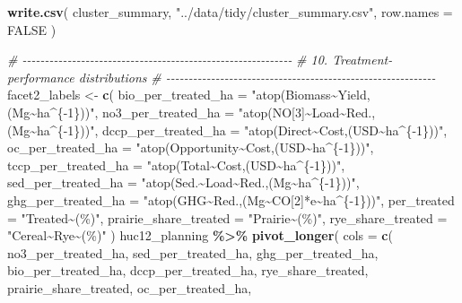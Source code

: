 \documentclass[
]{article}
\newenvironment{Shaded}{\begin{snugshade}}{\end{snugshade}}
\newcommand{\AttributeTok}[1]{\textcolor[rgb]{0.13,0.29,0.53}{#1}}
\newcommand{\CommentTok}[1]{\textcolor[rgb]{0.56,0.35,0.01}{\textit{#1}}}
\newcommand{\ConstantTok}[1]{\textcolor[rgb]{0.56,0.35,0.01}{#1}}
\newcommand{\FunctionTok}[1]{\textcolor[rgb]{0.13,0.29,0.53}{\textbf{#1}}}
\newcommand{\NormalTok}[1]{#1}
\newcommand{\OtherTok}[1]{\textcolor[rgb]{0.56,0.35,0.01}{#1}}
\newcommand{\SpecialCharTok}[1]{\textcolor[rgb]{0.81,0.36,0.00}{\textbf{#1}}}
\newcommand{\StringTok}[1]{\textcolor[rgb]{0.31,0.60,0.02}{#1}}
\begin{document}
\begin{Shaded}
\begin{Highlighting}[]
\FunctionTok{write.csv}\NormalTok{(}
\NormalTok{  cluster\_summary,}
  \StringTok{"../data/tidy/cluster\_summary.csv"}\NormalTok{,}
  \AttributeTok{row.names =} \ConstantTok{FALSE}
\NormalTok{)}

\CommentTok{\# {-}{-}{-}{-}{-}{-}{-}{-}{-}{-}{-}{-}{-}{-}{-}{-}{-}{-}{-}{-}{-}{-}{-}{-}{-}{-}{-}{-}{-}{-}{-}{-}{-}{-}{-}{-}{-}{-}{-}{-}{-}{-}{-}{-}{-}{-}{-}{-}{-}{-}{-}{-}{-}{-}{-}{-}{-}{-}{-}{-}}
\CommentTok{\# 10. Treatment{-}performance distributions}
\CommentTok{\# {-}{-}{-}{-}{-}{-}{-}{-}{-}{-}{-}{-}{-}{-}{-}{-}{-}{-}{-}{-}{-}{-}{-}{-}{-}{-}{-}{-}{-}{-}{-}{-}{-}{-}{-}{-}{-}{-}{-}{-}{-}{-}{-}{-}{-}{-}{-}{-}{-}{-}{-}{-}{-}{-}{-}{-}{-}{-}{-}{-}}
\NormalTok{facet2\_labels }\OtherTok{\textless{}{-}} \FunctionTok{c}\NormalTok{(}
  \AttributeTok{bio\_per\_treated\_ha   =} \StringTok{"atop(Biomass\textasciitilde{}Yield,(Mg\textasciitilde{}ha\^{}\{{-}1\}))"}\NormalTok{,}
  \AttributeTok{no3\_per\_treated\_ha      =} \StringTok{"atop(NO[3]\textasciitilde{}Load\textasciitilde{}Red.,(Mg\textasciitilde{}ha\^{}\{{-}1\}))"}\NormalTok{,}
  \AttributeTok{dccp\_per\_treated\_ha     =} \StringTok{"atop(Direct\textasciitilde{}Cost,(USD\textasciitilde{}ha\^{}\{{-}1\}))"}\NormalTok{,}
  \AttributeTok{oc\_per\_treated\_ha =} \StringTok{"atop(Opportunity\textasciitilde{}Cost,(USD\textasciitilde{}ha\^{}\{{-}1\}))"}\NormalTok{,}
  \AttributeTok{tccp\_per\_treated\_ha =} \StringTok{"atop(Total\textasciitilde{}Cost,(USD\textasciitilde{}ha\^{}\{{-}1\}))"}\NormalTok{,}
  \AttributeTok{sed\_per\_treated\_ha      =} \StringTok{"atop(Sed.\textasciitilde{}Load\textasciitilde{}Red.,(Mg\textasciitilde{}ha\^{}\{{-}1\}))"}\NormalTok{,}
  \AttributeTok{ghg\_per\_treated\_ha      =} \StringTok{"atop(GHG\textasciitilde{}Red.,(Mg\textasciitilde{}CO[2]*e\textasciitilde{}ha\^{}\{{-}1\}))"}\NormalTok{,}
  \AttributeTok{per\_treated =} \StringTok{"Treated\textasciitilde{}(\textquotesingle{}\%\textquotesingle{})"}\NormalTok{,}
  \AttributeTok{prairie\_share\_treated   =} \StringTok{"Prairie\textasciitilde{}(\textquotesingle{}\%\textquotesingle{})"}\NormalTok{,}
  \AttributeTok{rye\_share\_treated     =} \StringTok{"Cereal\textasciitilde{}Rye\textasciitilde{}(\textquotesingle{}\%\textquotesingle{})"}
\NormalTok{)}
\NormalTok{huc12\_planning }\SpecialCharTok{\%\textgreater{}\%}
  \FunctionTok{pivot\_longer}\NormalTok{(}
    \AttributeTok{cols =} \FunctionTok{c}\NormalTok{(}
\NormalTok{      no3\_per\_treated\_ha,}
\NormalTok{      sed\_per\_treated\_ha,}
\NormalTok{      ghg\_per\_treated\_ha,}
\NormalTok{      bio\_per\_treated\_ha,}
\NormalTok{      dccp\_per\_treated\_ha,}
\NormalTok{      rye\_share\_treated,}
\NormalTok{      prairie\_share\_treated,}
\NormalTok{      oc\_per\_treated\_ha,}
      

\end{Highlighting}
\end{Shaded}
\end{document}
